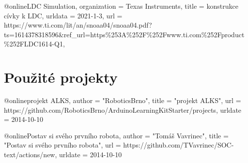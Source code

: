 @online{LDC Simulation,
    organization = {Texas Instruments},
    title        = {konstrukce cívky k LDC},
    urldata      = {2021-1-3},
    url          = {https://www.ti.com/lit/an/\-sn\-oaa04\-/snoaa04.pdf?ts=1614378318596&ref_url=https\%253A\%252F\%252F\-www\-.ti.com\%252Fproduct\%252FLDC1614-Q1},
}                                                                                               

\section{Použité projekty}
@online{projekt ALKS,
	author = "RoboticsBrno", %
    title = "projekt ALKS", %
    url = {https://github.com/RoboticsBrno/ArduinoLearningKitStarter/projects},
    urldate = {2014-10-10}
}

    @online{Postav si svého prvního robota,
	author = "Tomáš Vavrinec",
    title = "Postav si svého prvního robota", 
    url = {https://github.com/TVavrinec/SOC-text/actions/new},
    urldate = {2014-10-10}
}   

